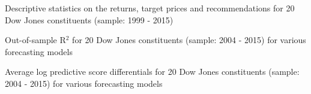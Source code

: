 \documentclass[9pt,xcolor=x11names,compress]{beamer}
\let\natbibcitep\citep
\renewcommand\citep{\bibpunct{(}{)}{;}{a}{,}{;}\natbibcitep}
\theoremstyle{standard}
\theoremstyle{notes}
\begin{document}
%



\begin{frame}{Descriptive statistics on the returns, target prices and recommendations for 20 Dow Jones constituents (sample: 1999 - 2015)}
	
\end{frame}

\begin{frame}{Out-of-sample R$^2$ for 20 Dow Jones constituents (sample: 2004 - 2015) for various forecasting models}
	 
\end{frame}

\begin{frame}{Average log predictive score differentials for 20 Dow Jones constituents (sample: 2004 - 2015) for various forecasting models}
	 
\end{frame}
\end{document}
